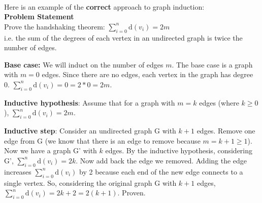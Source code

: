 \documentclass{article}
\theoremstyle{definition}
\begin{document}
\begin{center}
\end{center} \\

Here is an example of the \textbf{correct} approach to graph induction: \\
\textbf{Problem Statement} \\
Prove the handshaking theorem: $\sum_{i=0}^{n}{\mathrm{d}(v_i)} = 2m$ \\
i.e. the sum of the degrees of each vertex in an undirected graph is twice the number of edges.

\textbf{Base case:} We will induct on the number of edges $m$. The base case is a graph with $m = 0$ edges. Since there are no edges, each vertex in the graph has degree 0. $\sum_{i=0}^{n}{\mathrm{d}(v_i)} = 0 = 2*0 = 2m$.

\textbf{Inductive hypothesis}: Assume that for a graph with $m=k$ edges (where  $k \geq 0$), $\sum_{i=0}^{n}{\mathrm{d}(v_i)} = 2m$.

\textbf{Inductive step}: Consider an undirected graph G with $k+1$ edges. Remove one edge from G (we know that there is an edge to remove because $m=k+1 \geq 1$). Now we have a graph G' with $k$ edges. By the inductive hypothesis, considering G',  $\sum_{i=0}^{n}{\mathrm{d}(v_i)} = 2k$. Now add back the edge we removed. Adding the edge increases $\sum_{i=0}^{n}{\mathrm{d}(v_i)}$ by 2 because each end of the new edge connects to a single vertex. So, considering the original graph G with $k+1$ edges, $\sum_{i=0}^{n}{\mathrm{d}(v_i)} = 2k + 2 = 2(k+1)$. Proven. 
\end{document}
